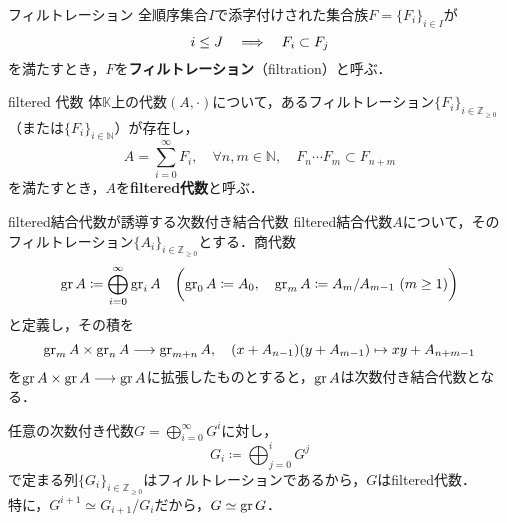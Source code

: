 \documentclass[rep_main]{subfiles}
\begin{document}
\begin{mydef}[label=def:filtration]{フィルトレーション}
	全順序集合$I$で添字付けされた集合族$F = \{F_i\}_{i \in I}$が
	\begin{equation}
		i \leq J  \quad \Longrightarrow \quad  F_i \subset F_j
	\end{equation}
	を満たすとき，$F$を\textbf{フィルトレーション}（filtration）と呼ぶ．
\end{mydef}
\begin{mydef}[label=def:filtered-alg]{filtered 代数}
	体$\mathbb{K}$上の代数$(A, \cdot)$について，あるフィルトレーション$\{F_i\}_{i \in \mathbb{Z}_{\geq 0}}$（または$\{F_i\}_{i \in \mathbb{N}}$）が存在し，
	\begin{equation}
		A = \sum_{i = 0}^\infty F_i,\quad  \forall n, m \in \mathbb{N},\quad  F_n\cdots F_m \subset F_{n+m}
	\end{equation}
	を満たすとき，$A$を\textbf{filtered代数}と呼ぶ．
\end{mydef}
\begin{myprop}[label=prop:graded-alg-by-filtered]{filtered結合代数が誘導する次数付き結合代数}
	filtered結合代数$A$について，そのフィルトレーション$\{A_i\}_{i \in \mathbb{Z}_{\geq 0}}$とする．商代数
	\begin{equation}
		\operatorname{gr} A \coloneqq \bigoplus_{i=0}^\infty\operatorname{gr}_i A\quad  \biggl(\operatorname{gr}_0A \coloneqq A_0,\quad  \operatorname{gr}_mA \coloneqq A_m / A_{m-1}\ (m \geq 1) \biggr)
	\end{equation}
	と定義し，その積を
	\begin{equation}
		\operatorname{gr}_m A \times \operatorname{gr}_n A \longrightarrow \operatorname{gr}_{m+n} A,\quad  (x + A_{n - 1})(y + A_{m - 1}) \mapsto xy + A_{n + m -1}
	\end{equation}
	を$\operatorname{gr} A \times \operatorname{gr} A \longrightarrow \operatorname{gr} A$に拡張したものとすると，$\operatorname{gr} A$は次数付き結合代数となる．
\end{myprop}
任意の次数付き代数$G = \bigoplus_{i=0}^\infty G^i$に対し，
\begin{equation}
	\label{eq:filtration-for-graded}
	G_i \coloneqq \bigoplus_{j = 0}^i G^j
\end{equation}
で定まる列$\{G_i\}_{i \in \mathbb{Z}_{\geq 0}}$はフィルトレーションであるから，$G$はfiltered代数．\\
特に，$G^{i+1} \simeq G_{i+1} / G_i$だから，$G \simeq \operatorname{gr} G$．
\end{document}
